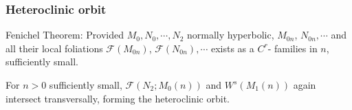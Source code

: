\documentclass{beamer}
\def\blue{\color{blue}}
\begin{document}
% 
%  
%  

\begin{frame}
 \frametitle{Heteroclinic orbit}
{\scriptsize 
 Fenichel Theorem: Provided $M_0, N_0, \cdots , N_2$ {\blue normally hyperbolic}, $M_{0n}$, $N_{0n}, \cdots$ and all their local foliations $\mathcal{F}(M_{0n})$, $\mathcal{F}(N_{0n}), \cdots$ {\blue exists} as a $C^r$- families in $n$, sufficiently small.
} 

\begin{corollary}
 For $n>0$ sufficiently small, $\mathcal{F}(N_2;M_0(n))$ and $W^{s}(M_1(n))$ again intersect transversally, forming the heteroclinic orbit.
\end{corollary}

\end{frame}
\end{document}
